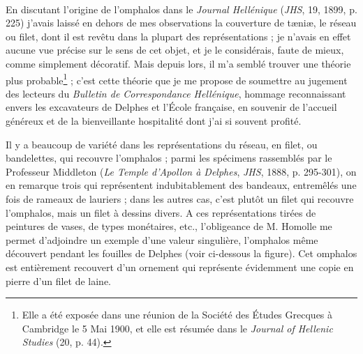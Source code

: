 \documentclass[a4paper, 11pt, oneside, polutonikogreek, french]{article}
\begin{document}
\paragraph{}
En discutant l'origine de l'omphalos dans le \emph{Journal Hellénique} (\emph{JHS}, 19, 1899, p. 225) j'avais laissé en dehors de mes observations la couverture de tæniæ, le réseau ou filet, dont il est revêtu dans la plupart des représentations ; je n'avais en effet aucune vue précise sur le sens de cet objet, et je le considérais, faute de mieux, comme simplement décoratif. Mais depuis lors, il m'a semblé trouver une théorie plus probable\footnote{Elle a été exposée dans une réunion de la Société des Études Grecques à Cambridge le 5 Mai 1900, et elle est résumée dans le \emph{Journal of Hellenic Studies} (20, p. 44).} ; c'est cette théorie que je me propose de soumettre au jugement des lecteurs du \emph{Bulletin de Correspondance Hellénique}, hommage reconnaissant envers les excavateurs de Delphes et l'École française, en souvenir de l'accueil généreux et de la bienveillante hospitalité dont j'ai si souvent profité.

Il y a beaucoup de variété dans les représentations du réseau, en filet, ou bandelettes, qui recouvre l'omphalos ; parmi les spécimens rassemblés par le Professeur Middleton (\emph{Le Temple d'Apollon à Delphes}, \emph{JHS}, 1888, p. 295-301), on en remarque trois qui représentent indubitablement des bandeaux, entremêlés une fois de rameaux de lauriers ; dans les autres cas, c'est plutôt un filet qui recouvre l'omphalos, mais un filet à dessins divers. A ces représentations tirées de peintures de vases, de types monétaires, etc., l'obligeance de M. Homolle me permet d'adjoindre un exemple d'une valeur singulière, l'omphalos même découvert pendant les fouilles de Delphes (voir ci-dessous la figure). Cet omphalos est entièrement recouvert d'un ornement qui représente évidemment une copie en pierre d'un filet de laine.
\end{document}
